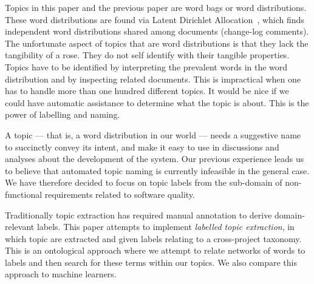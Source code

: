 \documentclass{acm_proc_article-sp}
\begin{document}
Topics in this paper and the previous paper are word bags or word distributions. These word distributions are found via Latent Dirichlet Allocation~\cite{Blei2003}, which finds independent word distributions shared among documents (change-log comments). The unfortunate aspect of topics that are word distributions is that they lack the tangibility of a rose. They do not self identify with their tangible properties. Topics have to be identified by interpreting the prevalent words in the word distribution and by inspecting related documents. This is impractical when one has to handle more than one hundred different topics. It would be nice if we could have automatic assistance to determine what the topic is about. This is the power of labelling and naming.



A topic --- that is, a word distribution in our world --- needs a suggestive name to succinctly convey its intent, and make it easy to use in discussions and analyses about the development of the system. Our previous experience leads us to believe that automated topic naming is currently infeasible in the general case. We have therefore decided to focus on topic labels from the sub-domain of non-functional requirements related to software quality.


Traditionally topic extraction has required manual annotation to derive domain-relevant labels. This paper attempts to implement \emph{labelled topic extraction}, in which topic are extracted and given labels relating to a cross-project taxonomy. This is an ontological approach where we attempt to relate networks of words to labels and then search for these terms within our topics. We also compare this approach to machine learners.
\end{document}
